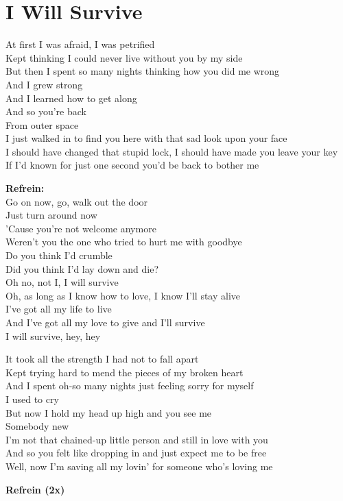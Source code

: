 \section{I Will Survive}
At first I was afraid, I was petrified\\
Kept thinking I could never live without you by my side\\
But then I spent so many nights thinking how you did me wrong\\
And I grew strong\\
And I learned how to get along\\
And so you're back\\
From outer space\\
I just walked in to find you here with that sad look upon your face\\
I should have changed that stupid lock, I should have made you leave your key\\
If I'd known for just one second you'd be back to bother me

\textbf{Refrein:}\\
Go on now, go, walk out the door\\
Just turn around now\\
'Cause you're not welcome anymore\\
Weren't you the one who tried to hurt me with goodbye\\
Do you think I'd crumble\\
Did you think I'd lay down and die?\\
Oh no, not I, I will survive\\
Oh, as long as I know how to love, I know I'll stay alive\\
I've got all my life to live\\
And I've got all my love to give and I'll survive\\
I will survive, hey, hey

It took all the strength I had not to fall apart\\
Kept trying hard to mend the pieces of my broken heart\\
And I spent oh-so many nights just feeling sorry for myself\\
I used to cry\\
But now I hold my head up high and you see me\\
Somebody new\\
I'm not that chained-up little person and still in love with you\\
And so you felt like dropping in and just expect me to be free\\
Well, now I'm saving all my lovin' for someone who's loving me

\textbf{Refrein (2x)}